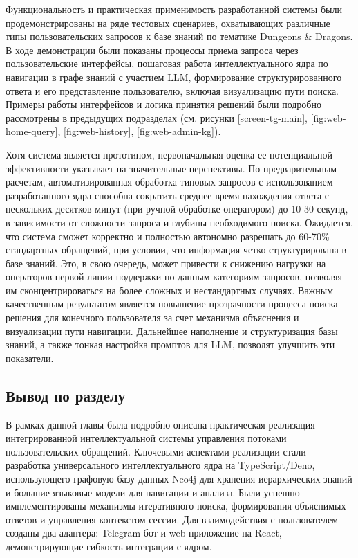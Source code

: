 Функциональность и практическая применимость разработанной системы были продемонстрированы на ряде тестовых сценариев, охватывающих различные типы пользовательских запросов к базе знаний по тематике Dungeons \& Dragons. В ходе демонстрации были показаны процессы приема запроса через пользовательские интерфейсы, пошаговая работа интеллектуального ядра по навигации в графе знаний с участием LLM, формирование структурированного ответа и его представление пользователю, включая визуализацию пути поиска. Примеры работы интерфейсов и логика принятия решений были подробно рассмотрены в предыдущих подразделах (см. рисунки \ref{screen-tg-main}, \ref{fig:web-home-query}, \ref{fig:web-history}, \ref{fig:web-admin-kg}).

Хотя система является прототипом, первоначальная оценка ее потенциальной эффективности указывает на значительные перспективы. По предварительным расчетам, автоматизированная обработка типовых запросов с использованием разработанного ядра способна сократить среднее время нахождения ответа с нескольких десятков минут (при ручной обработке оператором) до 10-30 секунд, в зависимости от сложности запроса и глубины необходимого поиска. Ожидается, что система сможет корректно и полностью автономно разрешать до 60-70\% стандартных обращений, при условии, что информация четко структурирована в базе знаний. Это, в свою очередь, может привести к снижению нагрузки на операторов первой линии поддержки по данным категориям запросов, позволяя им сконцентрироваться на более сложных и нестандартных случаях. Важным качественным результатом является повышение прозрачности процесса поиска решения для конечного пользователя за счет механизма объяснения и визуализации пути навигации. Дальнейшее наполнение и структуризация базы знаний, а также тонкая настройка промптов для LLM, позволят улучшить эти показатели.

\subsection{Вывод по разделу}

В рамках данной главы была подробно описана практическая реализация интегрированной интеллектуальной системы управления потоками пользовательских обращений. Ключевыми аспектами реализации стали разработка универсального интеллектуального ядра на TypeScript/Deno, использующего графовую базу данных Neo4j для хранения иерархических знаний и большие языковые модели для навигации и анализа. Были успешно имплементированы механизмы итеративного поиска, формирования объяснимых ответов и управления контекстом сессии. Для взаимодействия с пользователем созданы два адаптера: Telegram-бот и  web-приложение на React, демонстрирующие гибкость интеграции с ядром.

